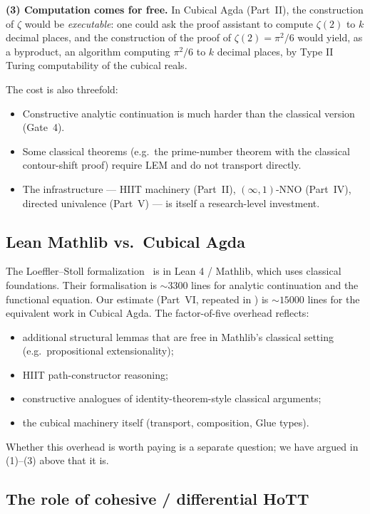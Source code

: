 \documentclass[12pt]{article}
\theoremstyle{definition}
\theoremstyle{remark}
\begin{document}
\textbf{(3) Computation comes for free.} In Cubical Agda (Part~II), the
construction of $\zeta$ would be \emph{executable}: one could ask the
proof assistant to compute $\zeta(2)$ to $k$ decimal places, and the
construction of the proof of $\zeta(2) = \pi^2/6$ would yield, as a
byproduct, an algorithm computing $\pi^2/6$ to $k$ decimal places, by
Type II Turing computability of the cubical reals.

The cost is also threefold:
\begin{itemize}[leftmargin=*]
\item Constructive analytic continuation is much harder than the
      classical version (Gate~4).
\item Some classical theorems (e.g.\ the prime-number theorem with the
      classical contour-shift proof) require LEM and do not transport
      directly.
\item The infrastructure --- HIIT machinery (Part~II), $(\infty,1)$-NNO
      (Part~IV), directed univalence (Part~V) --- is itself a
      research-level investment.
\end{itemize}

\subsection{Lean Mathlib vs.\ Cubical Agda}

The Loeffler--Stoll formalization~\cite{loefflerstoll} is in Lean 4 /
Mathlib, which uses classical foundations. Their formalisation is
$\sim 3300$ lines for analytic continuation and the functional
equation. Our estimate (Part~VI, repeated in
) is $\sim 15000$ lines for the equivalent
work in Cubical Agda. The factor-of-five overhead reflects:
\begin{itemize}[leftmargin=*]
\item additional structural lemmas that are free in Mathlib's
      classical setting (e.g.\ propositional extensionality);
\item HIIT path-constructor reasoning;
\item constructive analogues of identity-theorem-style classical
      arguments;
\item the cubical machinery itself (transport, composition, Glue
      types).
\end{itemize}
Whether this overhead is worth paying is a separate question; we have
argued in (1)--(3) above that it is.

\subsection{The role of cohesive / differential HoTT}
\end{document}
